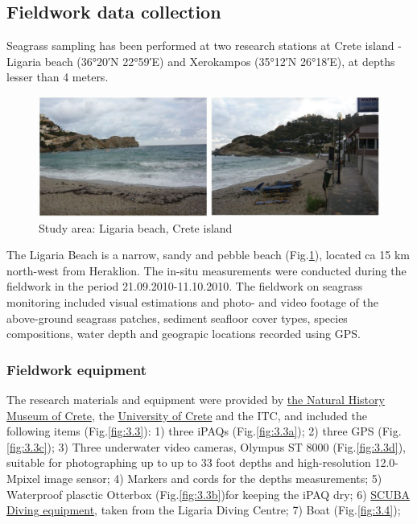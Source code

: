 \documentclass[10pt, a4paper]{article}
\begin{document}
\subsection{Fieldwork data collection}
Seagrass sampling has been performed at two research stations at Crete island - Ligaria beach
(36°20′N 22°59′E) and Xerokampos (35°12′N 26°18′E), at depths lesser than 4 meters. 

\begin{figure}[h]
	\centering
	\includegraphics[scale=0.25]{Fig-17.jpg}
	\caption{Study area: Ligaria beach, Crete island}
	\label{fig:3.2}
\end{figure}

The Ligaria Beach is a narrow, sandy and pebble beach (Fig.\ref{fig:3.2}), located ca 15 km north-west from Heraklion.
The in-situ measurements were conducted during the fieldwork in the period 21.09.2010-11.10.2010.
The fieldwork on seagrass monitoring included visual estimations and photo- and video footage of the
above-ground seagrass patches, sediment seafloor cover types, species compositions, water depth and
geograpic locations recorded using GPS.
\pagebreak

\subsubsection{Fieldwork equipment}
The research materials and equipment were provided by \href{http://www.nhmc.uoc.gr/index-2.htm}{the Natural History Museum of Crete}, the \href{http://www.uoc.gr/Department/index.html}{University of Crete} and the ITC, and included the following items (Fig.\ref{fig:3.3}): 1) three iPAQs (Fig.\ref{fig:3.3a}); 2)
three GPS (Fig.\ref{fig:3.3c}); 3) Three underwater video cameras, Olympus ST 8000  (Fig.\ref{fig:3.3d}), suitable for
photographing up to up to 33 foot depths and high-resolution 12.0-Mpixel image sensor; 4)
Markers and cords for the depths measurements; 5) Waterproof plasctic Otterbox  (Fig.\ref{fig:3.3b})for keeping the
iPAQ dry; 6) \href{http://www.padi.com/scuba/}{SCUBA Diving equipment}, taken from the Ligaria Diving Centre; 7) Boat (Fig.\ref{fig:3.4}); 
\end{document}
